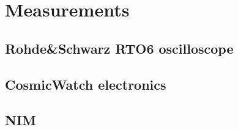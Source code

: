 \chapter{Measurements}\label{chap:measurements}

\section{Rohde\&Schwarz RTO6 oscilloscope}

\section{CosmicWatch electronics}

\section{NIM}